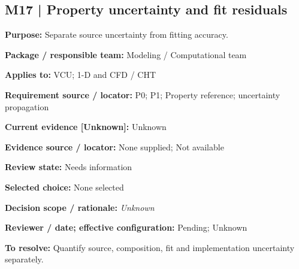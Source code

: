 \documentclass[11pt]{article}
\begin{document}
\par\noindent\begin{minipage}{\textwidth}\small\setlength{\parskip}{2pt}
\subsection*{M17 | Property uncertainty and fit residuals}
\textbf{Purpose:} Separate source uncertainty from fitting accuracy.\par
\textbf{Package / responsible team:} Modeling / Computational team\par
\textbf{Applies to:} VCU; 1-D and CFD / CHT\par
\textbf{Requirement source / locator:} P0; P1; Property reference; uncertainty propagation\par
\textbf{Current evidence [Unknown]:} Unknown\par
\textbf{Evidence source / locator:} None supplied; Not available\par
\textbf{Review state:} Needs information\par
\textbf{Selected choice:} None selected\par
\textbf{Decision scope / rationale:} \textit{Unknown}\par
\textbf{Reviewer / date; effective configuration:} Pending; Unknown\par
\textbf{To resolve:} Quantify source, composition, fit and implementation uncertainty separately.\par
\end{minipage}\par\vspace{5pt}
\end{document}
